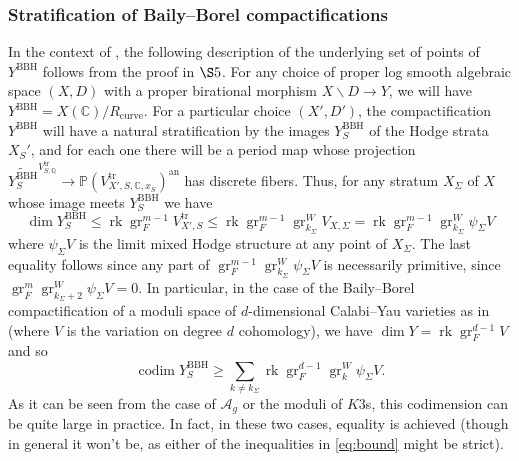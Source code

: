 \documentclass{amsart}
\newcommand{\bs}{\backslash}
\newcommand{\codim}{\operatorname{codim}}
\newcommand{\an}{\operatorname{an}}
\theoremstyle{definition}
\theoremstyle{remark}
\def\bQ{\mathbb{Q}}
\def\bC{\mathbb{C}}
\def\bP{\mathbb{P}}
\def\cA{\mathcal{A}}
\def\an{\mathrm{an}}
\def\gr{\operatorname{gr}}
\def\trans{\mathrm{tr}}
\def\rk{\operatorname{rk}}
\def\curve{\mathrm{curve}}
\def\BBH{\mathrm{BBH}}
\numberwithin{equation}{section}
\begin{document}
\subsubsection{Stratification of Baily--Borel compactifications}\label{rem:CYnumerics} In the context of , the following description of the underlying set of points of $Y^\BBH$ follows from the proof in $\S 5$.  For any choice of proper log smooth algebraic space $(X,D)$ with a proper birational morphism $X\bs D\to Y$, we will have $Y^\BBH=X(\bC)/R_\curve$.  For a particular choice $(X',D')$, the compactification $Y^\BBH$ will have a natural stratification by the images $Y^\BBH_S$ of the Hodge strata $X_S'$, and for each one there will be a period map whose projection $\widetilde{Y_S^\BBH}^{V_{S,\bQ}^\trans}\to\bP(V_{X',S,\bC,x_S}^\trans)^\an$ has discrete fibers.  Thus, for any stratum $X_\Sigma$ of $X$ whose image meets $Y_S^\BBH$ we have 
\begin{equation}\dim Y^\BBH_S\leq \rk \gr_F^{m-1}V^\trans_{X',S}\leq \rk \gr_F^{m-1}\gr^W_{k_\Sigma}V_{X,\Sigma}=\rk \gr_F^{m-1}\gr^W_{k_\Sigma}\psi_\Sigma V\label{eq:bound}\end{equation}
where $\psi_{\Sigma} V$ is the limit mixed Hodge structure at any point of $X_{\Sigma}$.  The last equality follows since any part of $\gr_F^{m-1}\gr^W_{k_\Sigma}\psi_\Sigma V$ is necessarily primitive, since $\gr_F^m\gr^W_{k_\Sigma+2}\psi_\Sigma V=0$.  In particular, in the case of the Baily--Borel compactification of a moduli space of $d$-dimensional Calabi--Yau varieties as in  (where $V$ is the variation on degree $d$ cohomology), we have $\dim Y=\rk \gr_F^{d-1} V$ and so
\[\codim Y^{\BBH}_S\geq \sum_{k\neq  k_\Sigma}\rk \gr_F^{d-1}\gr^W_k\psi_\Sigma V.\]
As it can be seen from the case of $\cA_g$ or the moduli of $K3$s, this codimension can be quite large in practice. In fact, in these two cases, equality is achieved (though in general it won't be, as either of the inequalities in \eqref{eq:bound} might be strict). 
\end{document}
